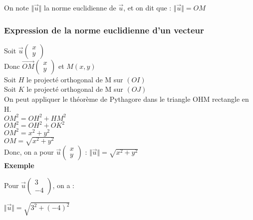 On note $\Vert \vec{u} \Vert $ la norme euclidienne de $\vec{u}$, et on dit que : $\Vert \vec{u} \Vert = OM $\\

\newpage

\subsubsection{Expression de la norme euclidienne d'un vecteur}

Soit $\vec{u}\left(\begin{array}{c} x\\ y \end{array}\right)$\\

Donc $\overrightarrow{OM}\left(\begin{array}{c} x\\ y \end{array}\right)$ et $M\left(x, y\right)$\\

Soit $H$ le projecté orthogonal de M sur $\left(OI\right)$\\

Soit $K$ le projecté orthogonal de M sur $\left(OJ\right)$\\

On peut appliquer le théorème de Pythagore dans le triangle OHM rectangle en H.\\

$ OM^2 = OH^2 + HM^2 $\\

$ OM^2 = OH^2 + OK^2 $\\

$ OM^2 = x^2 + y^2 $\\

$ OM = \sqrt{x^{2} + y^{2}} $\\

Donc, on a pour $\vec{u}\left(\begin{array}{c} x\\ y \end{array}\right)$ : $\Vert \vec{u} \Vert = \sqrt{x^2 + y^2}$\\

\textbf{Exemple}

Pour $\vec{u}\left(\begin{array}{c} 3\\ -4 \end{array}\right)$, on a :

$\Vert \vec{u} \Vert = \sqrt{3^2 + \left(-4\right)^2}$\\

